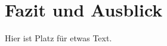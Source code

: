 \chapter{Fazit und Ausblick}
\begin{spacing}{1.1}
	Hier ist Platz für etwas Text.
\end{spacing}
\cleardoublepage
{}